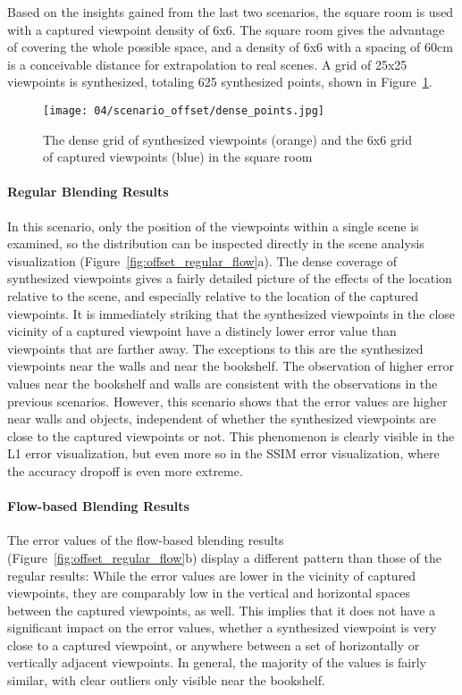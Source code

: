Based on the insights gained from the last two scenarios, the square room is used with a captured viewpoint density of 6x6. The square room gives the advantage of covering the whole possible space, and a density of 6x6 with a spacing of 60cm is a conceivable distance for extrapolation to real scenes. A grid of 25x25 viewpoints is synthesized, totaling 625 synthesized points, shown in Figure~\ref{fig:scenario_offset_setup}.

\begin{figure}[b]
		\centering
		\texttt{[image: 04/scenario\_offset/dense\_points.jpg]}
		\caption[The dense grid of synthesized viewpoints in the square room]{The dense grid of synthesized viewpoints (orange) and the 6x6 grid of captured viewpoints (blue) in the square room}
		\label{fig:scenario_offset_setup}
\end{figure}

\paragraph{Regular Blending Results}
In this scenario, only the position of the viewpoints within a single scene is examined, so the distribution can be inspected directly in the scene analysis visualization (Figure~\ref{fig:offset_regular_flow}a). The dense coverage of synthesized viewpoints gives a fairly detailed picture of the effects of the location relative to the scene, and especially relative to the location of the captured viewpoints. It is immediately striking that the synthesized viewpoints in the close vicinity of a captured viewpoint have a distincly lower error value than viewpoints that are farther away. The exceptions to this are the synthesized viewpoints near the walls and near the bookshelf. The observation of higher error values near the bookshelf and walls are consistent with the observations in the previous scenarios. However, this scenario shows that the error values are higher near walls and objects, independent of whether the synthesized viewpoints are close to the captured viewpoints or not. This phenomenon is clearly visible in the L1 error visualization, but even more so in the SSIM error visualization, where the accuracy dropoff is even more extreme. 


\paragraph{Flow-based Blending Results}
The error values of the flow-based blending results (Figure~\ref{fig:offset_regular_flow}b) display a different pattern than those of the regular results: While the error values are lower in the vicinity of captured viewpoints, they are comparably low in the vertical and horizontal spaces between the captured viewpoints, as well. This implies that it does not have a significant impact on the error values, whether a synthesized viewpoint is very close to a captured viewpoint, or anywhere between a set of horizontally or vertically adjacent viewpoints. In general, the majority of the values is fairly similar, with clear outliers only visible near the bookshelf.

